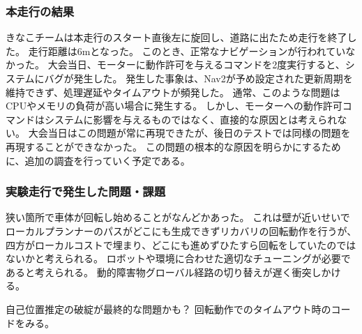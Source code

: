 \subsubsection{本走行の結果}
きなこチームは本走行のスタート直後左に旋回し、道路に出たため走行を終了した。
走行距離は6mとなった。
このとき、正常なナビゲーションが行われていなかった。
大会当日、モーターに動作許可を与えるコマンドを2度実行すると、システムにバグが発生した。
発生した事象は、Nav2が予め設定された更新周期を維持できず、処理遅延やタイムアウトが頻発した。
通常、このような問題はCPUやメモリの負荷が高い場合に発生する。
しかし、モーターへの動作許可コマンドはシステムに影響を与えるものではなく、直接的な原因とは考えられない。
大会当日はこの問題が常に再現できたが、後日のテストでは同様の問題を再現することができなかった。
この問題の根本的な原因を明らかにするために、追加の調査を行っていく予定である。

\subsubsection{実験走行で発生した問題・課題}
狭い箇所で車体が回転し始めることがなんどかあった。
これは壁が近いせいでローカルプランナーのパスがどこにも生成できずリカバリの回転動作を行うが、四方がローカルコストで埋まり、どこにも進めずひたすら回転をしていたのではないかと考えられる。
ロボットや環境に合わせた適切なチューニングが必要であると考えられる。
動的障害物グローバル経路の切り替えが遅く衝突しかける。


自己位置推定の破綻が最終的な問題かも？
回転動作でのタイムアウト時のコードをみる。
